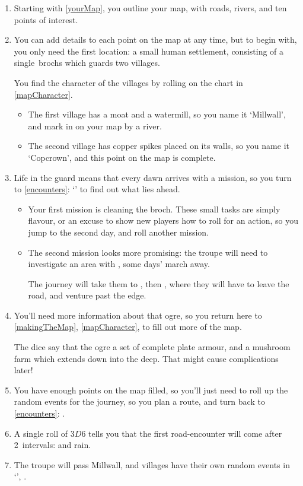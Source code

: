 \begin{multicols}{2}

\begin{enumerate}
  \item
  Starting with \autoref{yourMap}, you outline your map, with roads, rivers, and ten points of interest.
  \item
  You can add details to each point on the map at any time, but to begin with, you only need the first location: a small human settlement, consisting of a single~\glspl{broch} which guards two \glspl{village}.

  You find the character of the \glspl{village} by rolling on the chart in \autoref{mapCharacter}.
  \begin{itemize}
    \item
    The first \gls{village} has a moat and a watermill, so you name it `Millwall', and mark in on your map by a river.
    \item
    The second \gls{village} has copper spikes placed on its walls, so you name it `Copcrown', and this point on the map is complete.
  \end{itemize}
  \item
  Life in the \gls{guard} means that every dawn arrives with a mission, so you turn to \autoref{encounters}: `' to find out what lies ahead.
  \begin{itemize}
    \item
    Your first mission is cleaning the \gls{broch}.
    These small tasks are simply flavour, or an excuse to show new players how to roll for an action, so you jump to the second day, and roll another mission.
    \item
    The second mission looks more promising: the troupe will need to investigate an area with , some days' march away.

    The journey will take them to , then , where they will have to leave the road, and venture past the \gls{edge}.
  \end{itemize}
  \item
  You'll need more information about that \gls{ogre}, so you return here to \autoref{makingTheMap}, \autoref{mapCharacter}, to fill out more of the map.

  The dice say that the \gls{ogre} a set of complete plate armour, and a mushroom farm which extends down into the \gls{deep}.
  That might cause complications later!
  \item
  You have enough points on the map filled, so you'll just need to roll up the random events for the journey, so you plan a route, and turn back to \autoref{encounters}: .
  \item
  A single roll of $3D6$ tells you that the first road-encounter will come after 2~\glspl{interval}:  and rain.
  \item
  The troupe will pass Millwall, and \Glspl{village} have their own random events in `', .


\end{enumerate}
\end{multicols}
